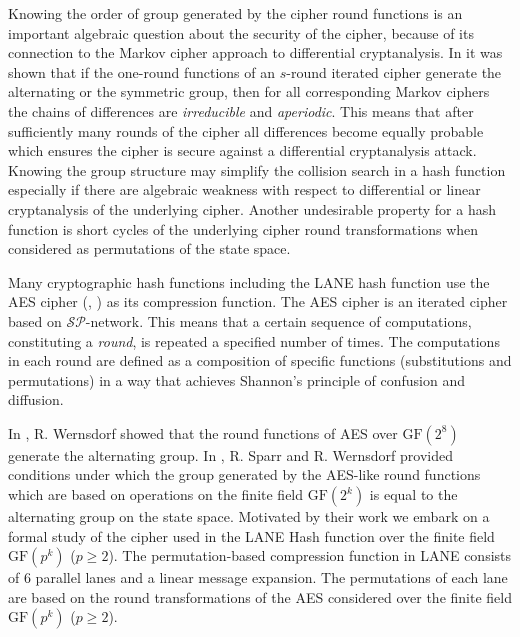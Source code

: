 \documentclass[11pt]{amsart}
\newcommand{\GF}{\mathrm{GF}}
\begin{document}
Knowing the order of group generated by the  cipher round functions  is an important algebraic question about the security of the cipher, because of its connection to the Markov cipher approach to differential cryptanalysis. In \cite {HSW} it was shown that if the one-round functions of an $s$-round iterated cipher generate the alternating or the symmetric group, then for all corresponding Markov ciphers the chains of  differences are {\it irreducible} and {\it aperiodic}. This means that after sufficiently many rounds of the cipher all differences become equally probable which ensures the cipher is secure against a differential cryptanalysis attack. Knowing the group structure may simplify the collision search in a hash function especially if there are algebraic weakness with respect to differential or linear cryptanalysis of the underlying cipher. Another undesirable property for a hash function is short cycles of the underlying cipher round transformations  when considered as permutations of the state space. 

Many cryptographic hash functions including the LANE hash function \cite{SP} use the AES cipher (\cite {DR}, \cite {DRB}) as its compression function.  The AES cipher is an iterated cipher based on $\mathcal {SP}$-network. This means that a certain sequence of computations, constituting a {\it round}, is repeated a specified number of times. The computations in each round are defined as a composition of specific functions (substitutions and permutations) in a way that achieves Shannon's principle \cite {S} of confusion and diffusion. 

In \cite{We}, R. Wernsdorf showed that the round functions of  AES over $\GF(2^8)$ generate the alternating group. In \cite {SW}, R. Sparr and R. Wernsdorf  provided conditions under which the group generated by the AES-like round functions which are based on operations on the finite field $\GF (2^k)$ is equal to the alternating group on the state space. Motivated by their work we embark on a formal study of the cipher used in the LANE  Hash function over the finite field $\GF (p^k)$ ($p\geq 2$). The permutation-based compression function in LANE consists of 6 parallel lanes and a linear message expansion. The permutations of each lane are based on the round transformations of the AES considered over the finite field $\GF (p^k)$ ($p\geq 2$). 

\end{document}

